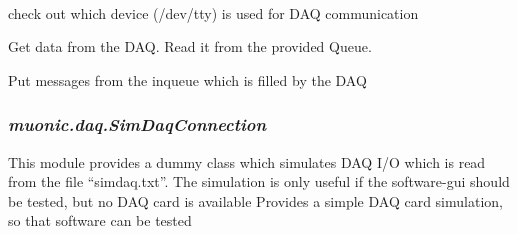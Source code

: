 \documentclass[letterpaper,10pt,english]{sphinxmanual}
\begin{document}
\begin{fulllineitems}
\label{muonic:muonic.daq.DaqConnection.DaqConnection}~

\begin{fulllineitems}
\label{muonic:muonic.daq.DaqConnection.DaqConnection.get_port}
check out which device (/dev/tty) is used for DAQ communication

\end{fulllineitems}


\begin{fulllineitems}
\label{muonic:muonic.daq.DaqConnection.DaqConnection.read}
Get data from the DAQ. Read it from the provided Queue.

\end{fulllineitems}


\begin{fulllineitems}
\label{muonic:muonic.daq.DaqConnection.DaqConnection.write}
Put messages from the inqueue which is filled by the DAQ

\end{fulllineitems}


\end{fulllineitems}



\subsubsection{\emph{muonic.daq.SimDaqConnection}}
\label{muonic:muonic-daq-simdaqconnection}
This module provides a dummy class which simulates DAQ I/O which is read from the file ``simdaq.txt''.
The simulation is only useful if the software-gui should be tested, but no DAQ card is available
\label{muonic:module-muonic.daq.SimDaqConnection}
Provides a simple DAQ card simulation, so that software can be tested
\end{document}
